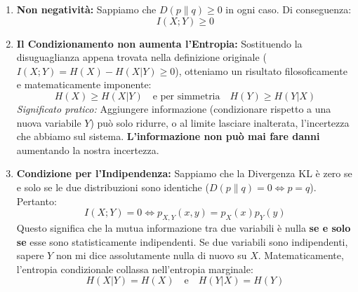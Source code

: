 \begin{enumerate}
    \item \textbf{Non negatività:} Sappiamo che $D(p \parallel q) \ge 0$ in ogni caso. Di conseguenza:
    \begin{equation}
        I(X;Y) \ge 0
    \end{equation}
    
    \item \textbf{Il Condizionamento non aumenta l'Entropia:} Sostituendo la disuguaglianza appena trovata nella definizione originale ($I(X;Y) = H(X) - H(X|Y) \ge 0$), otteniamo un risultato filosoficamente e matematicamente imponente:
    \begin{equation}
        H(X) \ge H(X|Y) \quad \text{e per simmetria} \quad H(Y) \ge H(Y|X)
    \end{equation}
    \textit{Significato pratico:} Aggiungere informazione (condizionare rispetto a una nuova variabile $Y$) può solo ridurre, o al limite lasciare inalterata, l'incertezza che abbiamo sul sistema. \textbf{L'informazione non può mai fare danni} aumentando la nostra incertezza.
    
    \item \textbf{Condizione per l'Indipendenza:} Sappiamo che la Divergenza KL è zero se e solo se le due distribuzioni sono identiche ($D(p \parallel q)=0 \iff p=q$). Pertanto:
    \begin{equation}
        I(X;Y) = 0 \iff p_{X,Y}(x,y) = p_X(x)p_Y(y)
    \end{equation}
    Questo significa che la mutua informazione tra due variabili è nulla \textbf{se e solo se} esse sono statisticamente indipendenti.
    Se due variabili sono indipendenti, sapere $Y$ non mi dice assolutamente nulla di nuovo su $X$. Matematicamente, l'entropia condizionale collassa nell'entropia marginale:
    \begin{equation}
        H(X|Y) = H(X) \quad \text{e} \quad H(Y|X) = H(Y)
    \end{equation}
\end{enumerate}